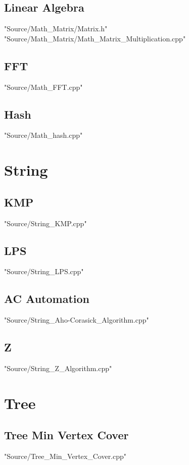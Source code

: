 \documentclass [12pt,twocolumn,oneside]{article}
\begin{document}
\subsection{Linear Algebra}
 {"Source/Math_Matrix/Matrix.h"}
 {"Source/Math_Matrix/Math_Matrix_Multiplication.cpp"}

\subsection{FFT}
 {"Source/Math_FFT.cpp"}

\subsection{Hash}
 {"Source/Math_hash.cpp"}




\newpage
\section{String}
\subsection{KMP}
 {"Source/String_KMP.cpp"}

\subsection{LPS}
 {"Source/String_LPS.cpp"}

\subsection{AC Automation}
 {"Source/String_Aho-Corasick_Algorithm.cpp"}

\subsection{Z}
 {"Source/String_Z_Algorithm.cpp"}




\newpage
\section{Tree}
\subsection{Tree Min Vertex Cover}
 {"Source/Tree_Min_Vertex_Cover.cpp"}
\end{document}
